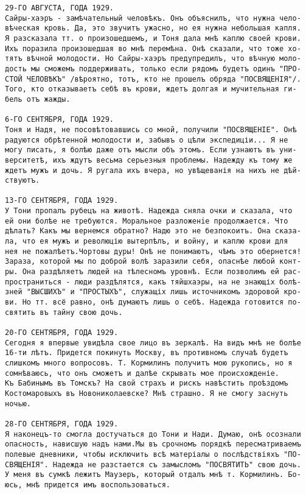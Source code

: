 \begin{verbatim}
29-ГО АВГУСТА, ГОДА 1929.
Сайры-хаэръ - замѣчательный человѣкъ. Онъ объяснилъ, что нужна чело-
вѣческая кровь. Да, это звучитъ ужасно, но ея нужна небольшая капля.
Я разсказала тт. о произошедшемъ, и Тоня дала мнѣ каплю своей крови.
Ихъ поразила произошедшая во мнѣ перемѣна. Онѣ сказали, что тоже хо-
тятъ вѣчной молодости. Но Сайры-хаэръ предупредилъ, что вѣчную моло-
дость мы сможемъ поддерживать, только если рядомъ будетъ одинъ "ПРО-
СТОЙ ЧЕЛОВѢКЪ" /вѣроятно, тотъ, кто не прошелъ обряда "ПОСВЯЩЕНІЯ"/.
Того, кто отказываетъ себѣ въ крови, ждетъ долгая и мучительная ги-
бель отъ жажды.

6-ГО СЕНТЯБРЯ, ГОДА 1929.
Тоня и Надя, не посовѣтовавшись со мной, получили "ПОСВЯЩЕНІЕ". Онѣ
радуются обрѣтенной молодости и, забывъ о цѣли экспедиціи... Я не
могу писать, я болѣю даже отъ мысли объ этомъ. Если узнаютъ въ уни-
верситетѣ, ихъ ждутъ весьма серьезныя проблемы. Надежду къ тому же
ждетъ мужъ и дочь. Я ругала ихъ вчера, но увѣщеванія на нихъ не дѣй-
ствуютъ.

13-ГО СЕНТЯБРЯ, ГОДА 1929.
У Тони пропалъ рубецъ на животѣ. Надежда сняла очки и сказала, что
ей они болѣе не требуются. Моральное разложенiе продолжается. Что
дѣлать? Какъ мы вернемся обратно? Надю это не безпокоитъ. Она сказа-
ла, что ея мужъ и революцію вытерпѣлъ, и войну, и каплю крови для
нея не пожалѣетъ.Чортовы дуры! Онѣ не понимаютъ, чѣмъ это обернется!
Зараза, которой мы по доброй волѣ заразили себя, опаснѣе любой конт-
ры. Она раздѣляетъ людей на тѣлесномъ уровнѣ. Если позволимъ ей рас-
пространиться - люди раздѣлятся, какъ тяйшхаэры, на не знающіх болѣ-
зней "ВЫСШИХЪ" и "ПРОСТЫХЪ", служащіх лишь источникомъ здоровой кро-
ви. Но тт. всё равно, онѣ думаютъ лишь о себѣ. Надежда готовится по-
святить въ тайну свою дочь.

20-ГО СЕНТЯБРЯ, ГОДА 1929.
Сегодня я впервые увидѣла свое лицо въ зеркалѣ. На видъ мнѣ не болѣе
16-ти лѣтъ. Придется покинуть Москву, въ противномъ случаѣ будетъ
слишкомъ много вопросовъ. Т. Кормилинъ получитъ мою рукопись, но я
сомнѣваюсь, что онъ сможетъ и далѣе скрывать мое происхожденіе.
Къ Бабинымъ въ Томскъ? На свой страхъ и рискъ навѣстить проѣздомъ
Костомаровыхъ въ Новониколаевске? Мнѣ страшно. Я не смогу заснуть
ночью.

28-ГО СЕНТЯБРЯ, ГОДА 1929.
Я наконецъ-то смогла достучаться до Тони и Нади. Думаю, онѣ осознали
опасность, нависшую надъ нами.Мы въ срочномъ порядкѣ пересматриваемъ
полевые дневники, чтобы исключить всѣ матеріалы о послѣдствіяхъ "ПО-
СВЯЩЕНІЯ". Надежда не разстается съ замысломъ "ПОСВЯТИТЬ" свою дочь.
У меня въ сумкѣ лежитъ Маузеръ, который отдалъ мнѣ т. Кормилинъ. Бо-
юсь, мнѣ придется имъ воспользоваться.
\end{verbatim}

